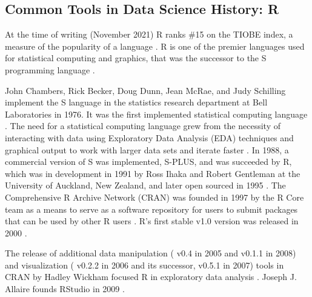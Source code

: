 \documentclass[010-intro.tex]{subfiles}
\begin{document}
    \subsection{Common Tools in Data Science History: R}
    \label{ss:intro-r-history}
    
        At the time of writing (November 2021) R ranks \#15 on the TIOBE index,
        a measure of the popularity of a language
        \cite{IndexTIOBESoftware}.
        R is one of the premier languages used for statistical computing and graphics,
        that was the successor to the S programming language
        \cite{ProjectStatisticalComputing}.

        John Chambers, Rick Becker, Doug Dunn, Jean McRae, and Judy Schilling
        implement the S language in the statistics research department at Bell Laboratories in 1976.
        It was the first implemented statistical computing language
        \cite{beckerBriefHistory1994}.
        The need for a statistical computing language grew from the necessity of
        interacting with data using Exploratory Data Analysis (EDA)
        techniques and graphical output
        to work with larger data sets and iterate faster
        \cite{beckerBriefHistory1994}.
        In 1988, a commercial version of S was implemented, S-PLUS, and was
        succeeded by R, which was in development in 1991 by
        Ross Ihaka and Robert Gentleman at the University of Auckland, New Zealand,
        and later open sourced in 1995
        \cite{beckerBriefHistory1994}.
        The Comprehensive R Archive Network (CRAN) was founded in 1997 by the R Core team
        as a means to serve as a software repository for users to submit packages that can be
        used by other R users
        \cite{hornikAnnounceCRAN1997}.
        R's first stable v1.0 version was released in 2000
        \cite{smith16YearsProject2016, ihakaProjectBriefHistory}.

        The release of additional
        data manipulation
        ( v0.4 in 2005 and  v0.1.1 in 2008)
        and visualization
        ( v0.2.2 in 2006 and its successor,  v0.5.1 in 2007)
        tools in CRAN by Hadley Wickham
        focused R in exploratory data analysis
        \cite{wickhamPracticalToolsExploring2008, tukeyExploratoryDataAnalysis1977}.
        Joseph J. Allaire founds RStudio in 2009
        \cite{allaireRStudioPBC2020, rstudioRStudio}.
\end{document}
